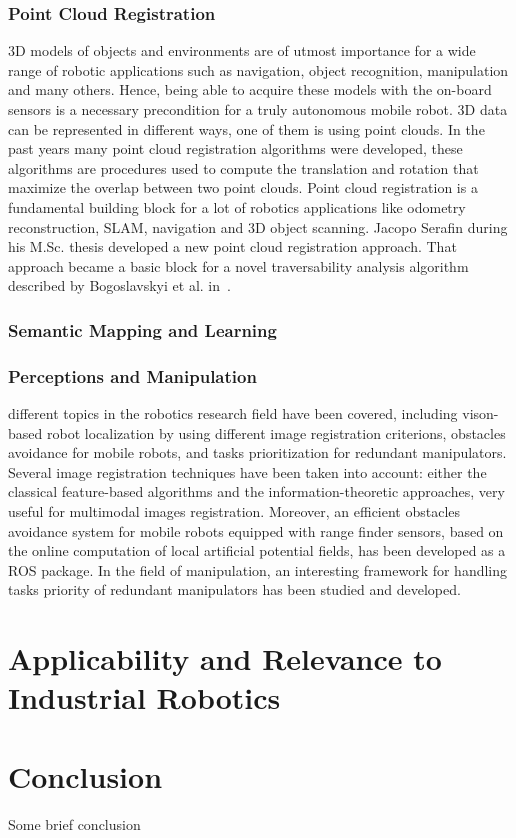 \documentclass[conference]{IEEEtran}
\begin{document}
\subsubsection{Point Cloud Registration}
3D models of objects and environments are of utmost importance for a wide range of robotic applications such as navigation, object recognition, manipulation and many others. Hence, being able to acquire these models with the on-board sensors is a necessary precondition for a truly autonomous mobile robot. 3D data can be represented in different ways, one of them is using point clouds. In the past years many point cloud registration algorithms were developed, these algorithms are procedures used to compute the translation and rotation that maximize the overlap between two point clouds. Point cloud registration is a fundamental building block for a lot of robotics applications like odometry reconstruction, SLAM, navigation and 3D object scanning. Jacopo Serafin during his M.Sc. thesis developed a new point cloud registration approach. That approach became a basic block for a novel traversability analysis algorithm described by Bogoslavskyi et al. in~\cite{bogoslavskyi-ECMR-13}.   

 

\subsubsection{Semantic Mapping and Learning}

\subsubsection{Perceptions and Manipulation}
different topics in the robotics research field have been covered, including vison-based robot localization by using different image registration criterions, obstacles avoidance for mobile robots, and tasks prioritization for redundant manipulators.
Several image registration techniques have been taken into account: either the classical feature-based algorithms and the information-theoretic approaches, very useful for multimodal images registration.
Moreover, an efficient obstacles avoidance system for mobile robots equipped with range finder sensors, based on the online computation of local artificial potential fields, has been developed as a ROS package.
\newline In the field of manipulation, an interesting framework for handling tasks priority of redundant manipulators has been studied and developed.

\section{Applicability and Relevance to Industrial Robotics}


\section{Conclusion}
Some brief conclusion


 

\end{document}
